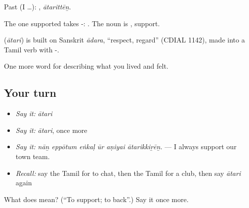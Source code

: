 Past (I …): , \emph{ātarittēṉ}.

The one supported takes -:  . The noun is , support.

\begin{cousinweb}
\textbf{} (\emph{ātari}) is built on Sanskrit \emph{ādara}, \textquotedblleft{}respect, regard\textquotedblright{} (CDIAL 1142), made into a Tamil verb with -.
\end{cousinweb}

\begin{grammarlens}[title={What you've built}]
One more word for describing what you lived and felt.
\end{grammarlens}

\subsection*{Your turn}
\begin{itemize}
\raggedright
  \item \emph{Say it:} \emph{ātari}
  \item \emph{Say it:} \emph{ātari}, once more
  \item \emph{Say it:} \emph{nāṉ eppōtum eṅkaḷ ūr aṇiyai ātarikkiṟēṉ.} — I always support our town team.
  \item \emph{Recall:} say the Tamil for to chat, then the Tamil for a club, then say \emph{ātari} again
\end{itemize}

\begin{tcolorbox}[breakable,colback=teal!4,colframe=teal!35!black,title={Before you move on}]
What does  mean? (\textquotedblleft{}To support; to back\textquotedblright{}.) Say it once more.
\end{tcolorbox}
